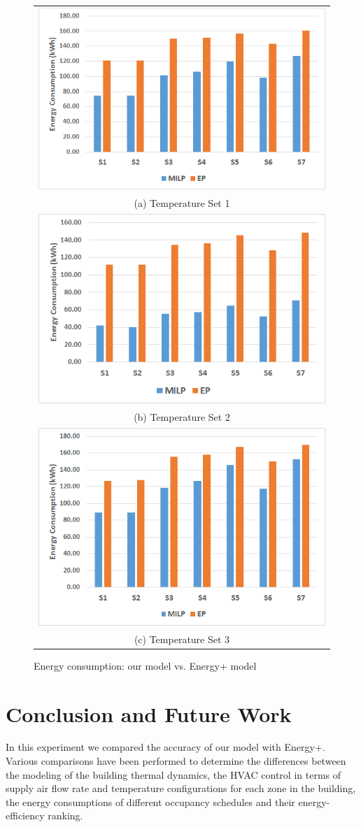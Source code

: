 \begin{figure} [h]
\vspace*{-2ex}
\centering
\begin{tabular}{c}
  \includegraphics[width=0.47\linewidth]{figs/app_sche_D7-12.png} \\
(a) Temperature Set 1 \\
  \includegraphics[width=0.47\linewidth]{figs/app_sche_D14-19.png} \\
(b) Temperature Set 2 \\
	\includegraphics[width=0.47\linewidth]{figs/app_sche_D21-26.png} \\
(c) Temperature Set 3 \\
\end{tabular}
\caption{Energy consumption: our model vs. Energy+ model}
\label{fig:compare_sche}
\vspace*{-2ex}
\end{figure}

\section{Conclusion and Future Work} \label{app:conclusion}

In this experiment we compared the accuracy of our model with Energy+. Various comparisons have been performed to determine the differences between the modeling of the building thermal dynamics, the HVAC control in terms of supply air flow rate and temperature configurations for each zone in the building, the energy consumptions of different occupancy schedules and their energy-efficiency ranking.

